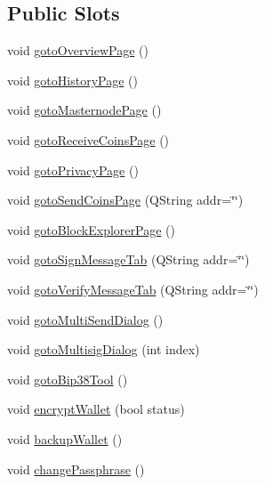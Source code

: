 \subsection*{Public Slots}
\begin{DoxyCompactItemize}
\item 
void \mbox{\hyperlink{class_wallet_frame_a44a96de92558a91a95142943484c88e8}{goto\+Overview\+Page}} ()
\item 
void \mbox{\hyperlink{class_wallet_frame_a31071d5befc21c99718a8b31e1e403ee}{goto\+History\+Page}} ()
\item 
void \mbox{\hyperlink{class_wallet_frame_a6a58c9776d210a7a094742f6d580d1e1}{goto\+Masternode\+Page}} ()
\item 
void \mbox{\hyperlink{class_wallet_frame_af13b99dcec7b866d405aadd533bb7b9d}{goto\+Receive\+Coins\+Page}} ()
\item 
void \mbox{\hyperlink{class_wallet_frame_ae0d27b173bcae0871b5a081216a80681}{goto\+Privacy\+Page}} ()
\item 
void \mbox{\hyperlink{class_wallet_frame_a6c97ac7f36c595b1c1f4b7fd1c1dc880}{goto\+Send\+Coins\+Page}} (Q\+String addr=\char`\"{}\char`\"{})
\item 
void \mbox{\hyperlink{class_wallet_frame_ad6dd35096ee0df1990ed897ac6e51943}{goto\+Block\+Explorer\+Page}} ()
\item 
void \mbox{\hyperlink{class_wallet_frame_a386b4f2e20af7d13a688662cd3f9e1fc}{goto\+Sign\+Message\+Tab}} (Q\+String addr=\char`\"{}\char`\"{})
\item 
void \mbox{\hyperlink{class_wallet_frame_af5cce5026575d013cb9d6933ebe7aa98}{goto\+Verify\+Message\+Tab}} (Q\+String addr=\char`\"{}\char`\"{})
\item 
void \mbox{\hyperlink{class_wallet_frame_a4422d7faeabc6ea3eb09c7b195a362bb}{goto\+Multi\+Send\+Dialog}} ()
\item 
void \mbox{\hyperlink{class_wallet_frame_af4fff0e71372888b35c447b08eb37aaf}{goto\+Multisig\+Dialog}} (int index)
\item 
void \mbox{\hyperlink{class_wallet_frame_a0a22b92967e8811dcf4637fe6774fef1}{goto\+Bip38\+Tool}} ()
\item 
void \mbox{\hyperlink{class_wallet_frame_a8a9a419ba3e249f29fe321f2d789b761}{encrypt\+Wallet}} (bool status)
\item 
void \mbox{\hyperlink{class_wallet_frame_a76aa3543635fedea052661a4cd44b81d}{backup\+Wallet}} ()
\item 
void \mbox{\hyperlink{class_wallet_frame_a0a4026a734acdc0f5fbd5f775c167443}{change\+Passphrase}} ()

\end{DoxyCompactItemize}
